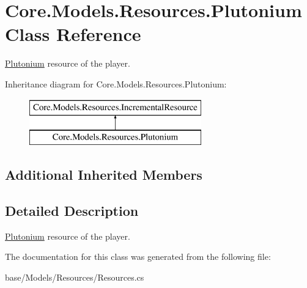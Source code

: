 \hypertarget{classCore_1_1Models_1_1Resources_1_1Plutonium}{}\section{Core.\+Models.\+Resources.\+Plutonium Class Reference}
\label{classCore_1_1Models_1_1Resources_1_1Plutonium}


\hyperlink{classCore_1_1Models_1_1Resources_1_1Plutonium}{Plutonium} resource of the player.  


Inheritance diagram for Core.\+Models.\+Resources.\+Plutonium\+:\begin{figure}[H]
\begin{center}
\leavevmode
\includegraphics[height=2.000000cm]{classCore_1_1Models_1_1Resources_1_1Plutonium}
\end{center}
\end{figure}
\subsection*{Additional Inherited Members}


\subsection{Detailed Description}
\hyperlink{classCore_1_1Models_1_1Resources_1_1Plutonium}{Plutonium} resource of the player. 



The documentation for this class was generated from the following file\+:\begin{DoxyCompactItemize}
\item 
base/\+Models/\+Resources/Resources.\+cs\end{DoxyCompactItemize}

